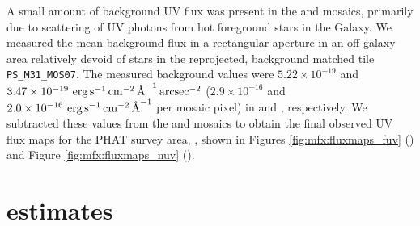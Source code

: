 \documentclass[iop, tighten]{emulateapj}
\begin{document}
A small amount of background UV flux was present in the \fuv{} and \nuv{}
mosaics, primarily due to scattering of UV photons from hot foreground stars in
the Galaxy. We measured the mean background flux in a rectangular aperture in
an off-galaxy area relatively devoid of stars in the reprojected, background
matched tile \texttt{PS\_M31\_MOS07}. The measured background values were $5.22
\times 10^{-19}$ and $3.47 \times 10^{-19}\, \,\mathrm{erg}\,\mathrm{s}^{-1}\,\mathrm{cm}^{-2}\,\textrm{\AA}^{-1}\,\mathrm{arcsec}^{-2}$ ($2.9 \times
10^{-16}$ and $2.0 \times 10^{-16}\, \,\mathrm{erg}\,\mathrm{s}^{-1}\,\mathrm{cm}^{-2}\,\textrm{\AA}^{-1}$ per mosaic pixel) in \fuv{} and
\nuv{}, respectively. We subtracted these values from the \fuv{} and \nuv{}
mosaics to obtain the final observed UV flux maps for the PHAT survey area,
\fxobs{}, shown in Figures \ref{fig:mfx:fluxmaps_fuv} (\fuv{}) and Figure
\ref{fig:mfx:fluxmaps_nuv} (\nuv{}).

%
%





\section{\sfr{} estimates}\label{mfx:sfrestimates}
\end{document}
